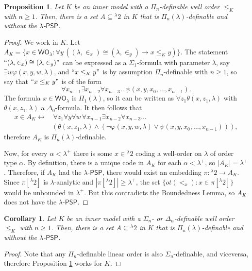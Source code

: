 \documentclass{amsart}
\numberwithin{equation}{section}
\newtheorem{corollary}[theorem]{Corollary}
\newtheorem{proposition}[theorem]{Proposition}
\theoremstyle{definition}
\theoremstyle{remark}
\begin{document}
\begin{proposition}\label{proposition:toy-example}
	Let $K$ be an inner model with a $\Pi_{n}$-definable well order $\leq_{K}$ with $n\geq1$. Then, there is a set $A\subseteq {}^{\lambda}2$ in $K$ that is $\Pi_n(\lambda)$-definable and without the $\lambda$-$\mathsf{PSP}$.
\end{proposition}
\begin{proof} 
	We work in $K$. Let $A_{K}=\{x\in \mathsf{WO}_{\lambda}:\forall y\,((\lambda,\in_x)\cong(\lambda,\in_y)\rightarrow x\leq_{K}y)\}$. The statement $``(\lambda,\in_x)\cong(\lambda,\in_y)"$ can be expressed as a $\Sigma_1$-formula with parameter $\lambda$, say $\exists w\varphi(x,y,w,\lambda)$, and $``x\leq_{K}y"$ is by assumption  $\Pi_{n}$-definable with $n\geq 1$, so say that $``x\leq_{K}y"$ is of the form $$\forall x_{n-1}\exists x_{n-2}\forall x_{n-3}\ldots\psi(x,y,x_0,\ldots,x_{n-1}).$$ The formula $x\in \mathsf{WO}_{\lambda}$ is $\Pi_1(\lambda)$, so it can be written as $\forall z_1\theta(x,z_1,\lambda)$ with $\theta(x,z_1,\lambda)$ a $\Delta_0$-formula. It then follows that
	\begin{equation*}
		\begin{split}
			x\in A_{K} \leftrightarrow& \,\forall z_1\forall y\forall w\,\forall x_{n-1}\exists x_{n-2}\forall x_{n-3}\ldots \\&(\theta(x,z_1,\lambda)\wedge(\neg\varphi(x,y,w,\lambda)\vee\psi(x,y,x_{0},\ldots,x_{n-1}))),
		\end{split}
	\end{equation*}
	therefore $A_{K}$ is $\Pi_n(\lambda)$-definable.
	
	Now, for every $\alpha<\lambda^{+}$ there is some $x\in {}^{\lambda}2$ coding a well-order on $\lambda$ of order type $\alpha$. By definition, there is a unique code in $A_{K}$ for each $\alpha<\lambda^{+}$, so $|A_{K}|=\lambda^{+}$. Therefore, if $A_{K}$ had the $\lambda$-$\mathsf{PSP}$, there would exist an embedding $\pi:{}^{\lambda}2\to A_{K}$. Since $\pi[{}^{\lambda}2]$ is $\lambda$-analytic and $|\pi[{}^{\lambda}2] |\geq \lambda^{+}$, the set $\{ot(<_{x}):x\in\pi[{}^{\lambda}2]\}$ would be unbounded in $\lambda^{+}$. But this contradicts the Boundedness Lemma, so $A_{K}$ does not have the $\lambda$-$\mathsf{PSP}$. 
\end{proof}

\begin{corollary}
  Let $K$ be an inner model with a $\Sigma_{n}$- or $\Delta_n$-definable well order $\leq_{K}$ with $n\geq1$. Then, there is a set $A\subseteq {}^{\lambda}2$ in $K$ that is $\Pi_n(\lambda)$-definable and without the $\lambda$-$\mathsf{PSP}$.
\end{corollary}
\begin{proof}
    Note that any $\Pi_n$-definable linear order is also $\Sigma_n$-definable, and viceversa, therefore Proposition \ref{proposition:toy-example} works for $K$.
\end{proof}
\end{document}
